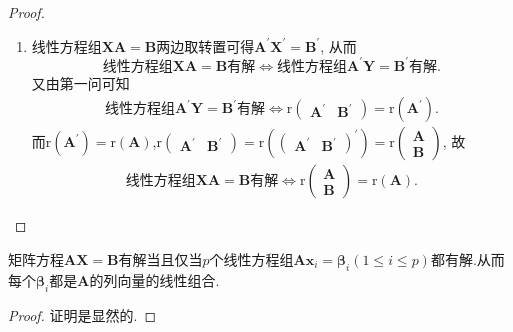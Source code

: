 \documentclass[../../main.tex]{subfiles}
\begin{document}
\begin{proof}
\begin{enumerate}
\item 线性方程组\(\boldsymbol{XA}=\boldsymbol{B}\)两边取转置可得\(\boldsymbol{A}^{\prime}\boldsymbol{X}^{\prime}=\boldsymbol{B}^{\prime}\), 从而
\[
\text{线性方程组}\boldsymbol{XA}=\boldsymbol{B}\text{有解}\Leftrightarrow\text{线性方程组}\boldsymbol{A}^{\prime}\boldsymbol{Y}=\boldsymbol{B}^{\prime}\text{有解}.
\]
又由第一问可知
\begin{align*}
\text{线性方程组}\boldsymbol{A}^{\prime}\boldsymbol{Y}=\boldsymbol{B}^{\prime}\text{有解}\Leftrightarrow \mathrm{r}\begin{pmatrix}\boldsymbol{A}^{\prime}&\boldsymbol{B}^{\prime}\end{pmatrix}=\mathrm{r}(\boldsymbol{A}^{\prime}).
\end{align*}
而\(\mathrm{r}(\boldsymbol{A}^{\prime})=\mathrm{r}(\boldsymbol{A})\),\(\mathrm{r}\begin{pmatrix}\boldsymbol{A}^{\prime}&\boldsymbol{B}^{\prime}\end{pmatrix}=\mathrm{r}\left(\begin{pmatrix}\boldsymbol{A}^{\prime}&\boldsymbol{B}^{\prime}\end{pmatrix}^{\prime}\right)=\mathrm{r}\begin{pmatrix}\boldsymbol{A}\\\boldsymbol{B}\end{pmatrix}\), 故
\begin{align*}
\text{线性方程组}\boldsymbol{XA}=\boldsymbol{B}\text{有解}\Leftrightarrow \mathrm{r}\begin{pmatrix}\boldsymbol{A}\\\boldsymbol{B}\end{pmatrix}=\mathrm{r}(\boldsymbol{A}).
\end{align*} 
\end{enumerate}
\end{proof}

\begin{proposition}
矩阵方程\(\boldsymbol{A}\boldsymbol{X}=\boldsymbol{B}\)有解当且仅当\(p\)个线性方程组\(\boldsymbol{A}\boldsymbol{x}_i=\boldsymbol{\beta}_i(1\leq i\leq p)\)都有解.从而每个\(\boldsymbol{\beta}_i\)都是\(\boldsymbol{A}\)的列向量的线性组合.
\end{proposition}
\begin{proof}
证明是显然的.
\end{proof}
\end{document}
